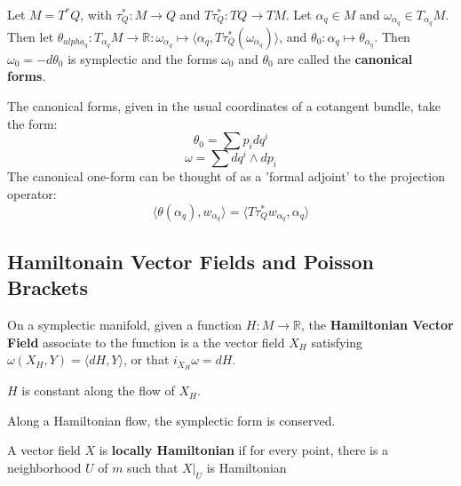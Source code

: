 \documentclass{article}
\begin{document}
\begin{thm}

Let $M = T^*Q$, with $\tau^*_Q: M \to Q$ and $T\tau^*_Q: TQ \to TM$. Let $\alpha_q \in M$ and $\omega_{\alpha_q} \in T_{\alpha_q}M$. Then let $ \theta_{alpha_q}: T_{\alpha_q}M \to \mathbb{R}: \omega_{\alpha_q} \mapsto \langle \alpha_q, T \tau^*_Q(\omega_{\alpha_q})\rangle  $, and $ \theta_0: \alpha_q \mapsto \theta_{\alpha_q} $. Then $\omega_0 = - d\theta_0$ is symplectic and the forms $\omega_0$ and $ \theta_0 $ are called the \textbf{canonical forms}.

\end{thm}
\indent The canonical forms, given in the usual coordinates of a cotangent bundle, take the form: 
\[\theta_0 = \sum p_i dq^i\]
\[\omega = \sum dq^i \wedge dp_i\]
\indent The canonical one-form can be thought of as a 'formal adjoint' to the projection operator:
\[\langle \theta(\alpha_q), w_{\alpha_q}\rangle  = \langle T\tau^*_Q w_{\alpha_q}, \alpha_q\rangle \]

\subsection{Hamiltonain Vector Fields and Poisson Brackets}



\begin{defn}

On a symplectic manifold, given a function $H: M \to \mathbb{R}$, the \textbf{Hamiltonian Vector Field} associate to the function is a the vector field $X_H$ satisfying $ \omega(X_H, Y) = \langle dH, Y\rangle $, or that $ i_{X_H}\omega = dH$. 

\end{defn}

\begin{prop}

$H$ is constant along the flow of $X_H$.

\end{prop}

\begin{prop}

Along a Hamiltonian flow, the symplectic form is conserved.

\end{prop}

\begin{defn}

A vector field $X$ is \textbf{locally Hamiltonian} if for every point, there is a neighborhood $U$ of $m$ such that $X\vert_U$ is Hamiltonian

\end{defn}
\end{document}
